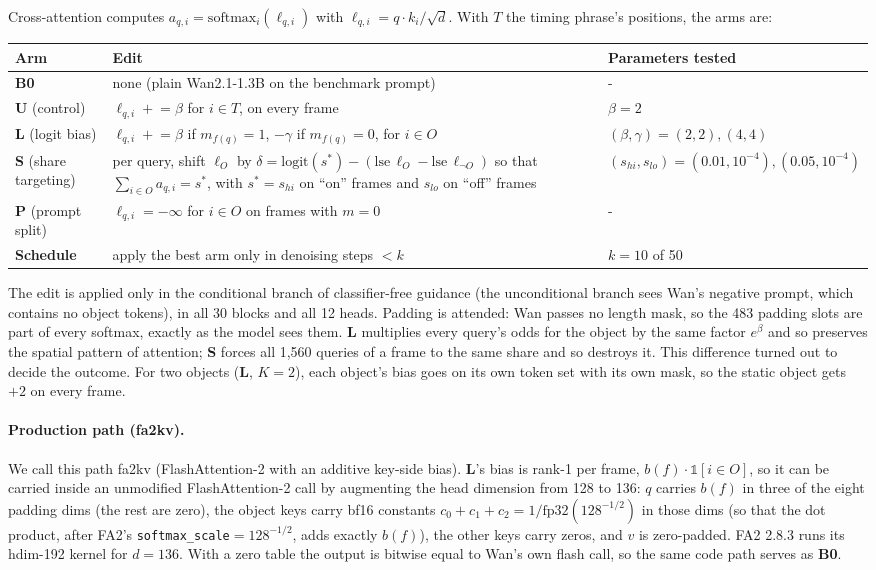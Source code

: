 \documentclass[10pt,a4paper]{article}
\newcommand{\arm}[1]{\textbf{#1}}
\begin{document}
Cross-attention computes $a_{q,i}=\mathrm{softmax}_i(\ell_{q,i})$ with $\ell_{q,i}=q\cdot k_i/\sqrt d$. With $T$ the timing phrase's positions, the arms are:
\begin{center}\small
\begin{tabularx}{\textwidth}{lYl}\toprule
Arm & Edit & Parameters tested\\\midrule
\arm{B0} & none (plain Wan2.1-1.3B on the benchmark prompt) & - \\
\arm{U} (control) & $\ell_{q,i}\mathrel{+}=\beta$ for $i\in T$, on every frame & $\beta=2$\\
\arm{L} (logit bias) & $\ell_{q,i}\mathrel{+}=\beta$ if $m_{f(q)}=1$, $-\gamma$ if $m_{f(q)}=0$, for $i\in O$ & $(\beta,\gamma)=(2,2),(4,4)$\\
\arm{S} (share targeting) & per query, shift $\ell_O$ by $\delta=\mathrm{logit}(s^*)-(\mathrm{lse}\,\ell_O-\mathrm{lse}\,\ell_{\neg O})$ so that $\sum_{i\in O}a_{q,i}=s^*$, with $s^*=s_{hi}$ on ``on'' frames and $s_{lo}$ on ``off'' frames & $(s_{hi},s_{lo})=(0.01,10^{-4}),(0.05,10^{-4})$\\
\arm{P} (prompt split) & $\ell_{q,i}=-\infty$ for $i\in O$ on frames with $m=0$ & - \\
\arm{Schedule} & apply the best arm only in denoising steps $<k$ & $k=10$ of 50\\
\bottomrule\end{tabularx}
\end{center}
The edit is applied only in the conditional branch of classifier-free guidance (the unconditional branch sees Wan's negative prompt, which contains no object tokens), in all 30 blocks and all 12 heads. Padding is attended: Wan passes no length mask, so the 483 padding slots are part of every softmax, exactly as the model sees them. \arm{L} multiplies every query's odds for the object by the same factor $e^{\beta}$ and so preserves the spatial pattern of attention; \arm{S} forces all 1{,}560 queries of a frame to the same share and so destroys it. This difference turned out to decide the outcome. For two objects (\arm{L}, $K=2$), each object's bias goes on its own token set with its own mask, so the static object gets $+2$ on every frame.

\paragraph{Production path (fa2kv).} We call this path fa2kv (FlashAttention-2 with an additive key-side bias). \arm{L}'s bias is rank-1 per frame, $b(f)\cdot\mathbb{1}[i\in O]$, so it can be carried inside an unmodified FlashAttention-2 call by augmenting the head dimension from 128 to 136: $q$ carries $b(f)$ in three of the eight padding dims (the rest are zero), the object keys carry bf16 constants $c_0+c_1+c_2=1/\mathrm{fp32}(128^{-1/2})$ in those dims (so that the dot product, after FA2's \texttt{softmax\_scale}$=128^{-1/2}$, adds exactly $b(f)$), the other keys carry zeros, and $v$ is zero-padded. FA2 2.8.3 runs its hdim-192 kernel for $d=136$. With a zero table the output is bitwise equal to Wan's own flash call, so the same code path serves as \arm{B0}.
\end{document}
